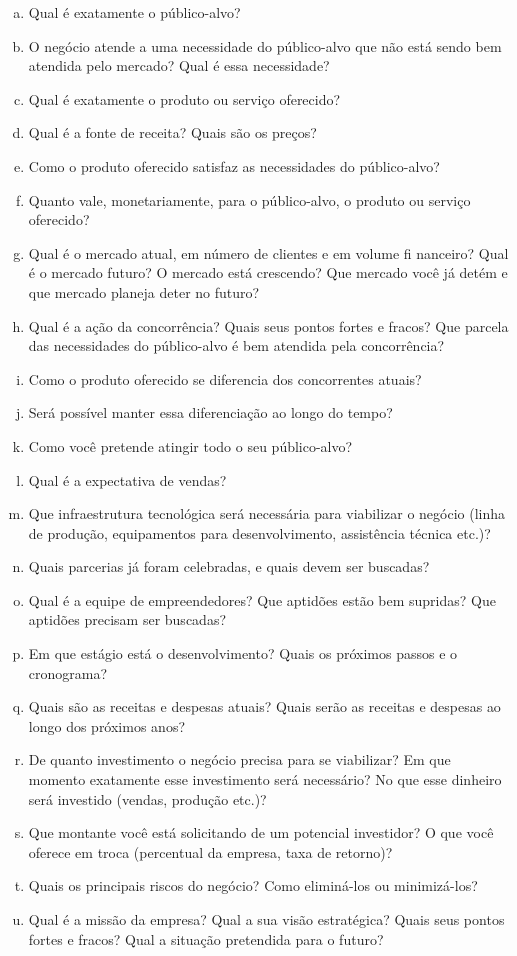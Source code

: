 \documentclass[a4paper,10pt]{article}
\begin{document}
\begin{enumerate}[a)]

\item Qual é exatamente o público-alvo?
\item O negócio atende a uma necessidade do público-alvo que não está sendo bem atendida pelo mercado? Qual é essa necessidade?
\item Qual é exatamente o produto ou serviço oferecido?
\item Qual é a fonte de receita? Quais são os preços?
\item Como o produto oferecido satisfaz as necessidades do público-alvo?
\item Quanto vale, monetariamente, para o público-alvo, o produto ou serviço oferecido?
\item Qual é o mercado atual, em número de clientes e em volume fi nanceiro? Qual é o mercado futuro? O mercado está crescendo? Que mercado você já detém e que mercado planeja deter no futuro?
\item Qual é a ação da concorrência? Quais seus pontos fortes e fracos? Que parcela das necessidades do público-alvo é bem atendida pela concorrência?
\item Como o produto oferecido se diferencia dos concorrentes atuais?
\item Será possível manter essa diferenciação ao longo do tempo?
\item Como você pretende atingir todo o seu público-alvo?
\item Qual é a expectativa de vendas?
\item Que infraestrutura tecnológica será necessária para viabilizar o negócio
(linha de produção, equipamentos para desenvolvimento, assistência técnica etc.)?
\item Quais parcerias já foram celebradas, e quais devem ser buscadas?
\item Qual é a equipe de empreendedores? Que aptidões estão bem supridas? Que aptidões precisam ser buscadas?
\item Em que estágio está o desenvolvimento? Quais os próximos passos e o cronograma?
\item Quais são as receitas e despesas atuais? Quais serão as receitas e despesas ao longo dos próximos anos?
\item De quanto investimento o negócio precisa para se viabilizar? Em que momento exatamente esse investimento será necessário? No que esse dinheiro será investido (vendas, produção etc.)?
\item Que montante você está solicitando de um potencial investidor? O que você oferece em troca (percentual da empresa, taxa de retorno)?
\item Quais os principais riscos do negócio? Como eliminá-los ou minimizá-los?
\item Qual é a missão da empresa? Qual a sua visão estratégica? Quais seus pontos fortes e fracos? Qual a situação pretendida para o futuro?
\end{enumerate}
\end{document}
